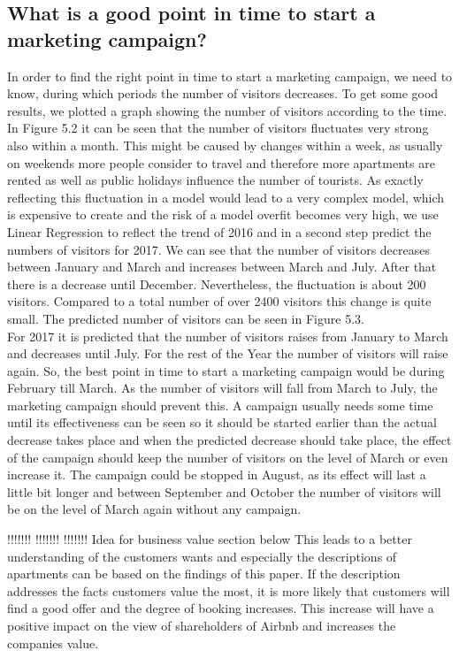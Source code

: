 \documentclass[journal]{IEEEtran}
\begin{document}
\subsection{What is a good point in time to start a marketing campaign?}
\noindent In order to find the right point in time to start a marketing campaign, we need to know, during which periods the number of visitors decreases. To get some good results, we plotted a graph showing the number of visitors according to the time.\\ In Figure 5.2 it can be seen that the number of visitors fluctuates very strong also within a month. This might be caused by changes within a week, as usually on weekends more people consider to travel and therefore more apartments are rented as well as public holidays influence the number of tourists. As exactly reflecting this fluctuation in a model would lead to a very complex model, which is expensive to create and the risk of a model overfit becomes very high, we use Linear Regression to reflect the trend of 2016 and in a second step predict the numbers of visitors for 2017. We can see that the number of visitors decreases between January and March and increases between March and July. After that there is a decrease until December. Nevertheless, the fluctuation is about 200 visitors. Compared to a total number of over 2400 visitors this change is quite small.
The predicted number of visitors can be seen in Figure 5.3.\\ For 2017 it is predicted that the number of visitors raises from January to March and decreases until July. For the rest of the Year the number of visitors will raise again. So, the best point in time to start a marketing campaign would be during February till March. As the number of visitors will fall from March to July, the marketing campaign should prevent this. A campaign usually needs some time until its effectiveness can be seen so it should be started earlier than the actual decrease takes place and when the predicted decrease should take place, the effect of the campaign should keep the number of visitors on the level of March or even increase it. The campaign could be stopped in August, as its effect will last a little bit longer and between September and October the number of visitors will be on the level of March again without any campaign.

!!!!!!!
!!!!!!!
!!!!!!! Idea for business value section below
This leads to a better understanding of the customers wants and especially the descriptions of apartments can be based on the findings of this paper. If the description addresses the facts customers value the most, it is more likely that customers will find a good offer and the degree of booking increases. This increase will have a positive impact on the view of shareholders of Airbnb and increases the companies value.
\end{document}
